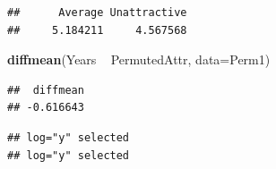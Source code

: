 \documentclass[]{book}
\newenvironment{Shaded}{\begin{snugshade}}{\end{snugshade}}
\newcommand{\KeywordTok}[1]{\textcolor[rgb]{0.13,0.29,0.53}{\textbf{{#1}}}}
\newcommand{\DataTypeTok}[1]{\textcolor[rgb]{0.13,0.29,0.53}{{#1}}}
\newcommand{\StringTok}[1]{\textcolor[rgb]{0.31,0.60,0.02}{{#1}}}
\newcommand{\NormalTok}[1]{{#1}}
\begin{document}
\begin{verbatim}
##      Average Unattractive 
##     5.184211     4.567568
\end{verbatim}

\begin{Shaded}
\begin{Highlighting}[]
\KeywordTok{diffmean}\NormalTok{(Years ~}\StringTok{ }\NormalTok{PermutedAttr, }\DataTypeTok{data=}\NormalTok{Perm1)}
\end{Highlighting}
\end{Shaded}

\begin{verbatim}
##  diffmean 
## -0.616643
\end{verbatim}




\begin{verbatim}
## log="y" selected
## log="y" selected
\end{verbatim}
\end{document}
